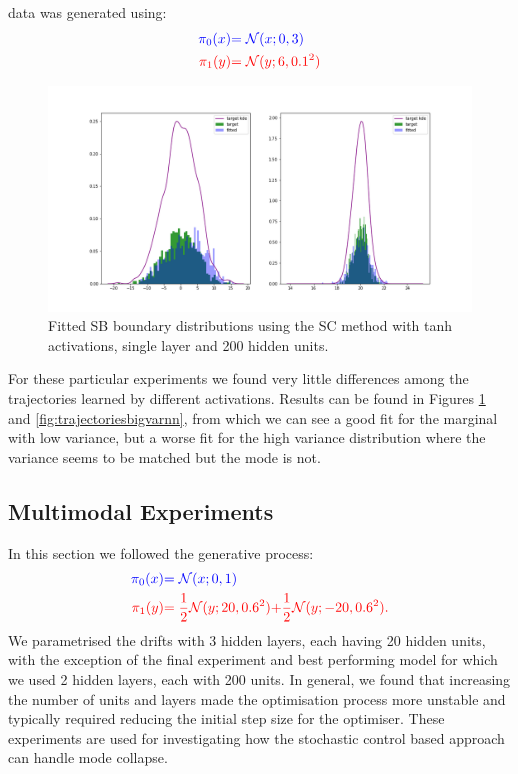 \documentclass[a4paper,12pt,twoside,openright]{report}
\theoremstyle{definition}
\begin{document}
data was generated using:
\begin{align*}
\color{blue}{\pi_0(x)} &\color{blue}{= {\mathcal{N}}(x; 0,  3)} \\
    \color{red}{\pi_1(y)} &\color{red}{= {\mathcal{N}}(y; 6, 0.1^2)} 
\end{align*}
\begin{figure}
    \centering
    \includegraphics[scale=0.4,trim={2.3cm 2cm 2cm 2cm}, clip]{images/Control/big_variance_tanh_marginals.png}
    \caption{ Fitted SB  boundary distributions using the SC method with tanh activations, single layer and 200 hidden units. }
    \label{fig:boundsbigvarnn}
\end{figure}

For these particular experiments we found very little differences among the trajectories learned by different activations. Results can be found in Figures \ref{fig:boundsbigvarnn} and \ref{fig:trajectoriesbigvarnn}, from which we can see a good fit for the marginal with low variance, but a worse fit for the high variance distribution where the variance seems to be matched but the mode is not.
\subsection{Multimodal Experiments}
In this section we followed the generative process:
\begin{align*}
     \color{blue}{\pi_0(x)} &\color{blue}{= {\mathcal{N}}(x; 0,  1)} \\
    \color{red}{\pi_1(y)} &\color{red}{= \frac{1}{2}{\mathcal{N}}(y; 20, 0.6 ^2)}\color{red}{ + \frac{1}{2}{\mathcal{N}}(y; -20, 0.6 ^2) }.
\end{align*}
We parametrised the drifts with 3 hidden layers, each having 20 hidden units, with the exception of the final experiment and best performing model for which we used 2 hidden layers, each with 200 units. In general, we found that increasing the number of units and layers made the optimisation process more unstable and typically required reducing the initial step size for the optimiser. These experiments are used for investigating how the stochastic control based approach can handle mode collapse.
\end{document}
